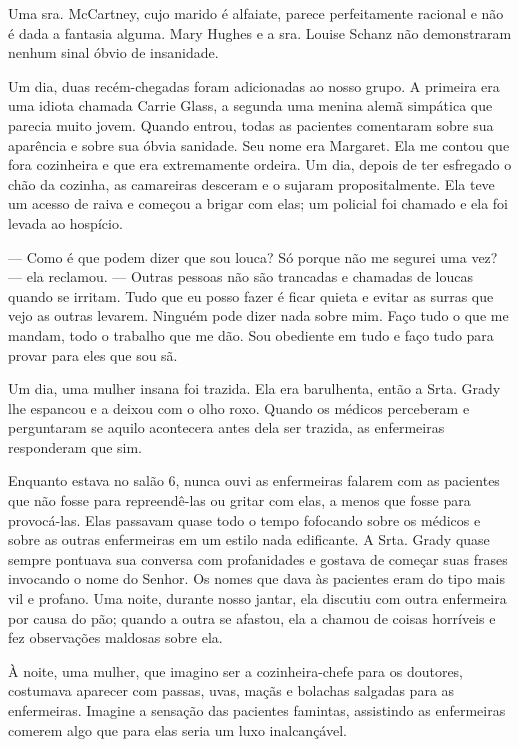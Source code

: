Uma sra. McCartney, cujo marido é alfaiate, parece perfeitamente
racional e não é dada a fantasia alguma. Mary Hughes e a sra. Louise
Schanz não demonstraram nenhum sinal óbvio de insanidade.

Um dia, duas recém-chegadas foram adicionadas ao nosso grupo. A primeira
era uma idiota chamada Carrie Glass, a segunda uma menina alemã
simpática que parecia muito jovem. Quando entrou, todas as pacientes
comentaram sobre sua aparência e sobre sua óbvia sanidade. Seu nome era
Margaret. Ela me contou que fora cozinheira e que era extremamente
ordeira. Um dia, depois de ter esfregado o chão da cozinha, as
camareiras desceram e o sujaram propositalmente. Ela teve um acesso de
raiva e começou a brigar com elas; um policial foi chamado e ela foi
levada ao hospício.

--- Como é que podem dizer que sou louca? Só porque não me segurei uma
vez? --- ela reclamou. --- Outras pessoas não são trancadas e chamadas
de loucas quando se irritam. Tudo que eu posso fazer é ficar quieta e
evitar as surras que vejo as outras levarem. Ninguém pode dizer nada
sobre mim. Faço tudo o que me mandam, todo o trabalho que me dão. Sou
obediente em tudo e faço tudo para provar para eles que sou sã.

Um dia, uma mulher insana foi trazida. Ela era barulhenta, então a Srta.
Grady lhe espancou e a deixou com o olho roxo. Quando os médicos
perceberam e perguntaram se aquilo acontecera antes dela ser trazida, as
enfermeiras responderam que sim.

Enquanto estava no salão 6, nunca ouvi as enfermeiras falarem com as
pacientes que não fosse para repreendê-las ou gritar com elas, a menos
que fosse para provocá-las. Elas passavam quase todo o tempo fofocando
sobre os médicos e sobre as outras enfermeiras em um estilo nada
edificante. A Srta. Grady quase sempre pontuava sua conversa com
profanidades e gostava de começar suas frases invocando o nome do
Senhor. Os nomes que dava às pacientes eram do tipo mais vil e profano.
Uma noite, durante nosso jantar, ela discutiu com outra enfermeira por
causa do pão; quando a outra se afastou, ela a chamou de coisas
horríveis e fez observações maldosas sobre ela.

À noite, uma mulher, que imagino ser a cozinheira-chefe para os
doutores, costumava aparecer com passas, uvas, maçãs e bolachas salgadas
para as enfermeiras. Imagine a sensação das pacientes famintas,
assistindo as enfermeiras comerem algo que para elas seria um luxo
inalcançável.

